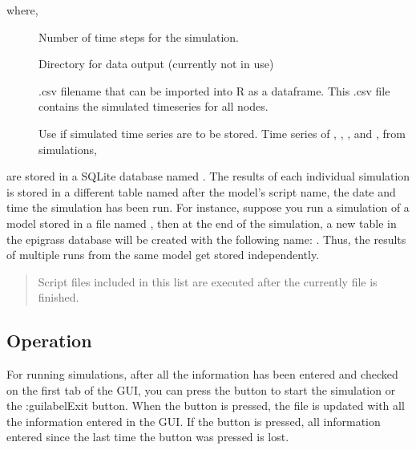 \documentclass[letterpaper,10pt,english]{sphinxmanual}
\begin{document}
where,
\begin{description}
\item[{}] \leavevmode
Number of time steps for the simulation.

\item[{}] \leavevmode
Directory for data output (currently not in use)

\item[{}] \leavevmode
.csv filename that can be imported into R as a dataframe. This .csv file contains the simulated timeseries for all nodes.

\item[{}] \leavevmode
Use  if simulated time series are to be stored. Time series of , , , and , from simulations,

\end{description}

are stored in a SQLite database named . The results of each individual simulation is stored in a different
table named after the model’s script name, the date and time the simulation has been run. For instance, suppose you run
a simulation of a model stored in a file named , then at the end of the simulation, a new table in the
epigrass database will be created with the following name: . Thus, the results of
multiple runs from the same model get stored independently.
\begin{quote}

Script files included in this list are executed after the currently file is finished.
\end{quote}


\subsection{Operation}
\label{\detokenize{using:operation}}
For running simulations, after all the information has been entered and checked on the first tab of the GUI, you can press the  button to start the simulation or the :guilabel\textasciigrave{}Exit\textasciigrave{} button. When the  button is pressed, the  file is updated with all the information entered in the GUI. If the  button is pressed, all information entered since the last time the  button was pressed is lost.
\end{document}
